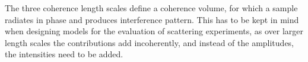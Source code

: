 \documentclass[\main/dresen_thesis.tex]{subfiles}
\begin{document}
    The three coherence length scales define a coherence volume, for which a sample radiates in phase and produces interference pattern.
    This has to be kept in mind when designing models for the evaluation of scattering experiments, as over larger length scales the contributions add incoherently, and instead of the amplitudes, the intensities need to be added.
\end{document}
